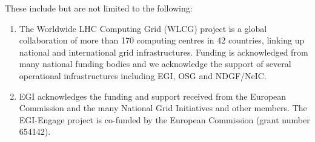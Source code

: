\documentclass[a4paper]{jpconf}
\begin{document}
These include but are not limited to the following:
\begin{enumerate}

\item The Worldwide LHC Computing Grid (WLCG) project is a global collaboration of more than 170 computing centres in 42 countries, linking up national and international grid infrastructures. Funding is acknowledged from many national funding bodies and we acknowledge the support of several operational infrastructures including EGI, OSG and NDGF/NeIC.

\item EGI acknowledges the funding and support received from the European Commission and the many National Grid Initiatives and other members. The EGI-Engage project is co-funded by the European Commission (grant number 654142).

\end{enumerate}
\end{document}
